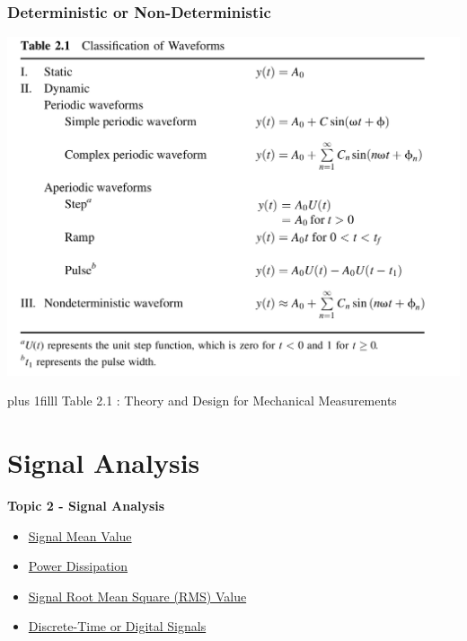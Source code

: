 \documentclass[fleqn]{beamer} %
\newcommand{\sectionIItitle}{Signal Analysis}
\newcommand{\sectionIsubsectionIVtitle}{Deterministic or Non-Deterministic}
\newcommand{\sectionIIsubsectionItitle}{Signal Mean Value}
\newcommand{\sectionIIsubsectionIItitle}{Power Dissipation}
\newcommand{\sectionIIsubsectionIIItitle}{Signal Root Mean Square (RMS) Value}
\newcommand{\sectionIIsubsectionIVtitle}{Discrete-Time or Digital Signals}
\newcommand{\btVFill}{\vskip0pt plus 1filll}
\begin{document}
			\begin{frame}
				\frametitle{\sectionIsubsectionIVtitle}

\bigskip

\includegraphics[scale=.15]{images/table_2_1.png}

\btVFill
\tiny{Table 2.1 : Theory and Design for Mechanical Measurements}
				
		

			\end{frame}

	
	\section{\sectionIItitle}\label{sectionII}

		\begin{frame}
			\large \textbf{Topic 2 - \sectionIItitle} \vspace{3mm}\\

			\begin{itemize}
				\item \hyperlink{sectionIIsubsectionI}{\sectionIIsubsectionItitle} \vspc %
				\item \hyperlink{sectionIIsubsectionII}{\sectionIIsubsectionIItitle} \vspc %
				\item \hyperlink{sectionIIsubsectionIII}{\sectionIIsubsectionIIItitle} \vspc %
				\item \hyperlink{sectionIIsubsectionIV}{\sectionIIsubsectionIVtitle} \vspc %
			\end{itemize}

		\end{frame}
\end{document}
